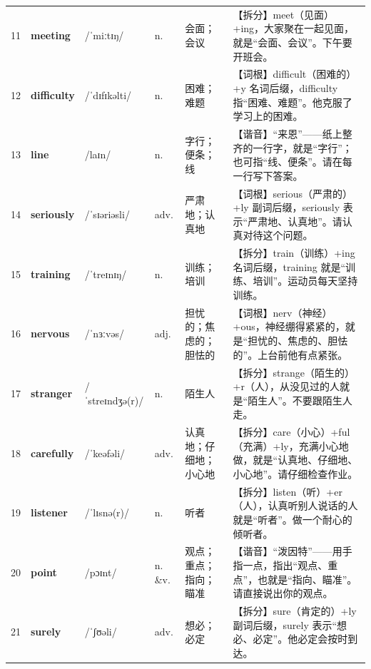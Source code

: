 \documentclass[UTF8,a4paper,11pt,oneside]{ctexbook}
\newcommand{\cellword}[1]{{\bfseries\textcolor{wordcol}{#1}}}
\newcommand{\cellipa}[1]{{\footnotesize\textcolor{ipacol}{#1}}}
\newcommand{\cellpos}[1]{\textcolor{poscol}{#1}}
\newcommand{\cellno}[1]{\textcolor{volcolor!75!black}{#1}}
\begin{document}
{\begin{longtable}{@{}C{0.045\textwidth}L{0.155\textwidth}L{0.175\textwidth}C{0.070\textwidth}L{0.180\textwidth}L{0.282\textwidth}@{}}
 \cellno{11} & \cellword{meeting} & \cellipa{/ˈmiːtɪŋ/} & \cellpos{n.} & 会面；会议 & \textcolor{tagSplit}{【拆分】}meet（见面）+ing，大家聚在一起见面，就是“会面、会议”。下午要开班会。 \\
\cellno{12} & \cellword{difficulty} & \cellipa{/ˈdɪfɪkəlti/} & \cellpos{n.} & 困难；难题 & \textcolor{tagRoot}{【词根】}difficult（困难的）+y 名词后缀，difficulty 指“困难、难题”。他克服了学习上的困难。 \\
 \cellno{13} & \cellword{line} & \cellipa{/laɪn/} & \cellpos{n.} & 字行；便条；线 & \textcolor{tagSound}{【谐音】}“来恩”——纸上整齐的一行字，就是“字行”；也可指“线、便条”。请在每一行写下答案。 \\
\cellno{14} & \cellword{seriously} & \cellipa{/ˈsɪəriəsli/} & \cellpos{adv.} & 严肃地；认真地 & \textcolor{tagRoot}{【词根】}serious（严肃的）+ly 副词后缀，seriously 表示“严肃地、认真地”。请认真对待这个问题。 \\
 \cellno{15} & \cellword{training} & \cellipa{/ˈtreɪnɪŋ/} & \cellpos{n.} & 训练；培训 & \textcolor{tagSplit}{【拆分】}train（训练）+ing 名词后缀，training 就是“训练、培训”。运动员每天坚持训练。 \\
\cellno{16} & \cellword{nervous} & \cellipa{/ˈnɜːvəs/} & \cellpos{adj.} & 担忧的；焦虑的；胆怯的 & \textcolor{tagRoot}{【词根】}nerv（神经）+ous，神经绷得紧紧的，就是“担忧的、焦虑的、胆怯的”。上台前他有点紧张。 \\
 \cellno{17} & \cellword{stranger} & \cellipa{/ˈstreɪndʒə(r)/} & \cellpos{n.} & 陌生人 & \textcolor{tagSplit}{【拆分】}strange（陌生的）+r（人），从没见过的人就是“陌生人”。不要跟陌生人走。 \\
\cellno{18} & \cellword{carefully} & \cellipa{/ˈkeəfəli/} & \cellpos{adv.} & 认真地；仔细地；小心地 & \textcolor{tagSplit}{【拆分】}care（小心）+ful（充满）+ly，充满小心地做，就是“认真地、仔细地、小心地”。请仔细检查作业。 \\
 \cellno{19} & \cellword{listener} & \cellipa{/ˈlɪsnə(r)/} & \cellpos{n.} & 听者 & \textcolor{tagSplit}{【拆分】}listen（听）+er（人），认真听别人说话的人就是“听者”。做一个耐心的倾听者。 \\
\cellno{20} & \cellword{point} & \cellipa{/pɔɪnt/} & \cellpos{n. \&v.} & 观点；重点；指向；瞄准 & \textcolor{tagSound}{【谐音】}“泼因特”——用手指一点，指出“观点、重点”，也就是“指向、瞄准”。请直接说出你的观点。 \\
 \cellno{21} & \cellword{surely} & \cellipa{/ˈʃʊəli/} & \cellpos{adv.} & 想必；必定 & \textcolor{tagSplit}{【拆分】}sure（肯定的）+ly 副词后缀，surely 表示“想必、必定”。他必定会按时到达。 \\

\end{longtable}}
\end{document}
